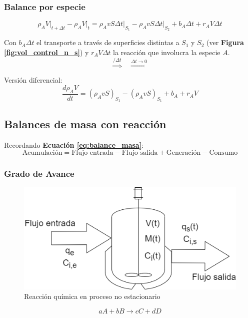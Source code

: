         \subsubsection{Balance por especie}
        \begin{equation}
        \label{eq:balance_masa_ns_especie}
            \rho_{A} V {|}_{t + \Delta t} - \rho_{A} V {|}_{t} = \rho_{A} v S \Delta t {|}_{S_{1}} - \rho_{A} v S \Delta t {|}_{S_{2}} + b_{A} \Delta t + r_{A} V \Delta t
        \end{equation}
        
        Con \(b_{A} \Delta t\) el transporte a través de superficies distintas a \(S_{1}\) y \(S_{2}\) (ver \textbf{Figura \ref{fig:vol_control_n_s}}) y \(r_{A} V \Delta t\) la reacción que involucra la especie \(A\).
        \[\overset{/\Delta t}{\Rightarrow}\;\;\;\overset{\Delta t \rightarrow 0}{\Rightarrow}\]
        
        Versión diferencial:
        \begin{equation}
        \label{eq:balance_masa_ns_especie_dif}
            \frac{d\rho_{A} V}{dt} = \left ( \rho_{A} v S \right )_{S_{1}} - \left ( \rho_{A} v S \right )_{S_{1}} + b_{A} + r_{A} V 
        \end{equation}
    
    \subsection{Balances de masa con reacción}
    
    Recordando \textbf{Ecuación \ref{eq:balance_masa}}:
    \[\text{Acumulación} = \text{Flujo entrada} - \text{Flujo salida} + \text{Generación} - \text{Consumo}\]
    
        \subsubsection{Grado de Avance}
    
        \begin{figure}
            \centering
            \includegraphics[width=.6\textwidth]{img/esquemas/process_rxn.png}
            \caption{Reacción química en proceso no estacionario}
            \label{fig:bm_ns_rxn}
        \end{figure}
        \[aA + bB \rightarrow cC + dD\]
        

